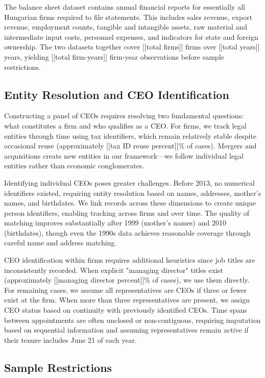 \documentclass[11pt,a4paper]{article}
\begin{document}
The balance sheet dataset contains annual financial reports for essentially all Hungarian firms required to file statements. This includes sales revenue, export revenue, employment counts, tangible and intangible assets, raw material and intermediate input costs, personnel expenses, and indicators for state and foreign ownership. The two datasets together cover [[total firms]] firms over [[total years]] years, yielding [[total firm-years]] firm-year observations before sample restrictions.

\subsection{Entity Resolution and CEO Identification}

Constructing a panel of CEOs requires resolving two fundamental questions: what constitutes a firm and who qualifies as a CEO. For firms, we track legal entities through time using tax identifiers, which remain relatively stable despite occasional reuse (approximately [[tax ID reuse percent]]\% of cases). Mergers and acquisitions create new entities in our framework—we follow individual legal entities rather than economic conglomerates.

Identifying individual CEOs poses greater challenges. Before 2013, no numerical identifiers existed, requiring entity resolution based on names, addresses, mother's names, and birthdates. We link records across these dimensions to create unique person identifiers, enabling tracking across firms and over time. The quality of matching improves substantially after 1999 (mother's names) and 2010 (birthdates), though even the 1990s data achieves reasonable coverage through careful name and address matching.

CEO identification within firms requires additional heuristics since job titles are inconsistently recorded. When explicit "managing director" titles exist (approximately [[managing director percent]]\% of cases), we use them directly. For remaining cases, we assume all representatives are CEOs if three or fewer exist at the firm. When more than three representatives are present, we assign CEO status based on continuity with previously identified CEOs. Time spans between appointments are often unclosed or non-contiguous, requiring imputation based on sequential information and assuming representatives remain active if their tenure includes June 21 of each year.

\subsection{Sample Restrictions}
\end{document}
